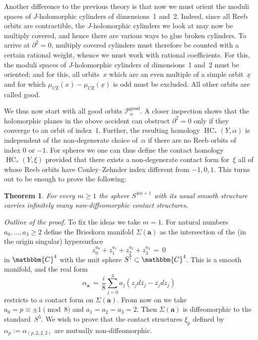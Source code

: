 \documentclass[12pt,twoside]{amsart}
\def\good{\operatorname{good}}
\theoremstyle{plain}
\newtheorem{theorem}{Theorem}[section]
\numberwithin{figure}{section}
\numberwithin{equation}{section}
\def\aa{\boldsymbol{a}}
\def\sCZ{ {\scriptscriptstyle\operatorname{CZ}}}
\def\HC{\operatorname{HC}}
\def\ga{\alpha}
\def\cp{{\mathcal P}}
\def\CC{\mathbbm{C}}
\def\pp{\partial}
\def\ni{\noindent}
\begin{document}
Another difference to the previous theory is that now we must orient the moduli spaces of 
$J$-holomorphic cylinders of dimensions~1 and~2.
Indeed, since all Reeb orbits are contractible, the $J$-holomorphic cylinders we look at
may now be multiply covered, and hence there are various ways to glue broken 
cylinders. 
To arrive at $\partial^2 =0$, multiply covered cylinders 
must therefore be counted with a certain rational weight, 
whence we must work with rational coefficients.
For this, the moduli spaces of $J$-holomorphic cylinders of dimensions~1 and~2 must be oriented;
and for this, all orbits~$x$ which are an even multiple of a simple orbit~$\underline x$
and for which $\mu_{\sCZ}(x) -\mu_{\sCZ}(\underline x)$ is odd must be excluded.
All other orbits are called good.

We thus now start with all good orbits $\cp_\ga^{\good}$.
A closer inspection shows that the holomorphic planes in the above accident can obstruct 
$\pp^2=0$ only if they converge to an orbit of index~$1$.
Further, the resulting homology $\HC_*(Y,\ga)$ is independent of the non-degenerate choice
of~$\ga$ if there are no Reeb orbits of index 0 or $-1$. 
For spheres we one can thus define the contact homology $\HC_*(Y,\xi)$
provided that there exists a non-degenerate contact form for~$\xi$ 
all of whose Reeb orbits have Conley--Zehnder index different from $-1,0,1$.
This turns out to be enough to prove the following:

\begin{theorem} \label{t:ust}
For every $m \geqslant 1$ the sphere $S^{4m+1}$ with its usual smooth structure
carries infinitely many non-diffeomorphic contact structures.
\end{theorem}

\ni 
{\it Outline of the proof.}
To fix the ideas we take $m=1$.
For natural numbers $a_0, \dots, a_3 \geqslant 2$ define 
the Brieskorn manifold $\Sigma (\aa)$ as the intersection of the
(in the origin singular) hypersurface 
$$
z_0^{a_0} + z_1^{a_1} + z_2^{a_2} + z_3^{a_3} \,=\, 0
$$
in $\CC^4$ with the unit sphere $S^7 \subset \CC^4$.
This is a smooth manifold, and the real form
%
\begin{equation} \label{e:aaa}
\ga_{\aa} \,=\,\frac{i}8 \sum_{j=0}^3 a_j (z_j d \overline{z_j} - \overline{z_j} dz_j) 
\end{equation}
restricts to a contact form on $\Sigma (\aa)$.
%
From now on we take $a_0 = p \equiv \pm 1 \pmod 8$ and $a_1 = a_2=a_3 =2$.
Then $\Sigma (\aa)$ is diffeomorphic to the standard~$S^5$.
We wish to prove that the contact structures $\xi_p$ defined by $\ga_p := \ga_{(p,2,2,2)}$
are mutually non-diffeomorphic.
\end{document}

